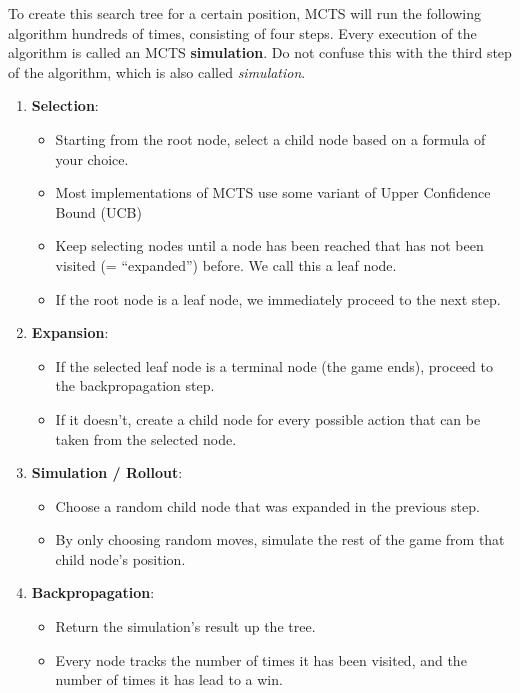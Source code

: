 \documentclass{article}
\begin{document}
To create this search tree for a certain position, MCTS will run the following algorithm hundreds of times, 
consisting of four steps. 
Every execution of the algorithm is called an MCTS \textbf{simulation}. 
Do not confuse this with the third step of the algorithm, which is also called \textit{simulation}. 

\begin{enumerate}
    \item \textbf{Selection}:
    \begin{itemize}
        \item Starting from the root node, select a child node based on a formula of your choice.
        \item Most implementations of MCTS use some variant of Upper Confidence Bound (UCB) \cite{MLMonteCarlo2019}
        \item Keep selecting nodes until a node has been reached that has not been visited (= ``expanded'') before. We call this a leaf node.
        \item If the root node is a leaf node, we immediately proceed to the next step.
    \end{itemize}
    \item \textbf{Expansion}:
    \begin{itemize}
        \item If the selected leaf node is a terminal node (the game ends), proceed to the backpropagation step.
        \item If it doesn't, create a child node for every possible action that can be taken from the selected node.
    \end{itemize}
    \item \textbf{Simulation / Rollout}:
    \begin{itemize}
        \item Choose a random child node that was expanded in the previous step.
        \item By only choosing random moves, simulate the rest of the game from that child node's position.
    \end{itemize}
    \item \textbf{Backpropagation}:
    \begin{itemize}
        \item Return the simulation's result up the tree.
        \item Every node tracks the number of times it has been visited, and the number of times it has lead to a win.
    \end{itemize}
\end{enumerate}
\end{document}
